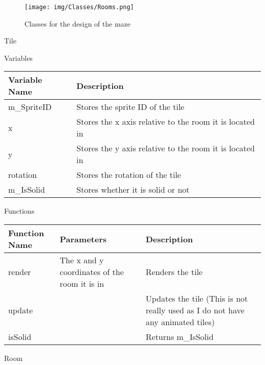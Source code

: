 \documentclass[../../Main.tex]{subfiles}
\begin{document}
    \begin{figure}[hbt!]
        \centerline{\texttt{[image: img/Classes/Rooms.png]}}
        \caption{Classes for the design of the maze}
        \label{fig}
    \end{figure}
    Tile
    \begin{center}
        Variables
        \begin{tabular}{ | m{} | m{} | }
            \hline
            \textbf{Variable Name} & \textbf{Description} \\
            \hline
            m\_SpriteID & Stores the sprite ID of the tile \\
            \hline
            x & Stores the x axis relative to the room it is located in \\
            \hline
            y & Stores the y axis relative to the room it is located in \\
            \hline
            rotation & Stores the rotation of the tile \\
            \hline
            m\_IsSolid & Stores whether it is solid or not \\
            \hline
        \end{tabular}
        Functions
        \begin{tabular}{ | m{} | m{}| m{} | }
            \hline
            \textbf{Function Name} & \textbf{Parameters} & \textbf{Description} \\
            \hline
            render & The x and y coordinates of the room it is in & Renders the tile \\
            \hline
            update & & Updates the tile (This is not really used as I do not have any animated tiles) \\
            \hline
            isSolid & & Returns m\_IsSolid \\
            \hline
        \end{tabular}
    \end{center}
    Room
\end{document}
